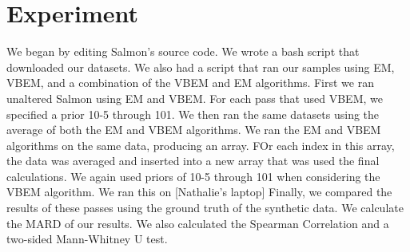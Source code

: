 \section{Experiment}

We began by editing Salmon’s source code. We wrote a bash script that downloaded our datasets. We also had a script that ran our samples using EM, VBEM, and a combination of the VBEM and EM algorithms. 
First we ran unaltered Salmon using EM and VBEM. For each pass that used VBEM, we specified a prior 10-5 through 101. 
	We then ran the same datasets using the average of both the EM and VBEM algorithms. We ran the EM and VBEM algorithms on the same data, producing an array. FOr each index in this array, the data was averaged and inserted into a new array that was used the final calculations. We again used priors of 10-5 through 101 when considering the VBEM algorithm. 
	We ran this on [Nathalie’s laptop]
	Finally, we compared the results of these passes using the ground truth of the synthetic data. We calculate the MARD of our results. We also calculated the Spearman Correlation and a two-sided Mann-Whitney U test. 

